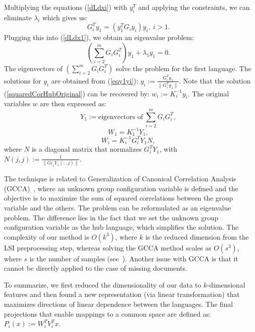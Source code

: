 Multiplying the equations (\ref{dLdxi}) with $y_i^T$ and applying the
constraints, we can eliminate $\lambda_i$ which gives us:
\begin{equation}\label{eqy1yi}
G_{i}^T y_1 = \left(y_1^T G_{i} y_i \right) y_i,~i > 1.
\end{equation}
Plugging this into (\ref{dLdx1}), we obtain an eigenvalue problem:
$$\left( \sum_{i = 2}^m G_i G_{i}^T \right) y_1 + \lambda_1 y_1 = 0.$$
The eigenvectors of $\left( \sum_{i = 2}^m G_i G_{i}^T \right)$ solve
the problem for the first language. The solutions for $y_i$ are obtained
from (\ref{eqy1yi}): $y_i := \frac{G_{i}^T y_1}{\| G_{i}^T y_1 \|}$.
Note that the solution (\ref{squaredCorHubOriginal}) can be recovered
by: $w_i := K_i^{-1} y_i$. The original variables $w$
are then expressed as:
$$ Y_1 := \text{eigenvectors of}~\sum_{i = 2}^m G_i G_{i}^T, $$
$$ W_1 = K_1^{-1} Y_1,$$
$$ W_i = K_i^{-1} G_{i}^T Y_1 N,$$
where $N$ is a diagonal matrix that normalizes $G_{i}^T Y_1$, with
$N(j,j) := \frac{1}{\|G(_{i} Y_1(:,j)\|}$.

 The technique is related to  Generalization of Canonical
Correlation Analysis (GCCA)~\cite{Carroll}, where an unknown
group configuration variable is defined and the objective is to maximize the
sum of squared correlations between the group variable and the others. The
problem can be reformulated as an eigenvalue problem. The difference lies in
the fact that we set the unknown group configuration variable as the hub language,
which simplifies the solution. The complexity of our method is $O(k^3)$, where $k$
is the reduced dimension from the LSI preprocessing step, whereas solving the
GCCA method scales as $O(s^3)$, where $s$ is the number of samples (see~\cite{gifi}).
Another issue with GCCA is that it cannot be directly applied to the case of missing documents.

To summarize, we first reduced the dimensionality of our data to $k$-dimensional
features and then found a new representation (via linear transformation) that
maximizes directions of linear dependence between the languages. The final
projections that enable mappings to a common space are defined as:
$P_i(x) := W_i^T V_i^T x.$

